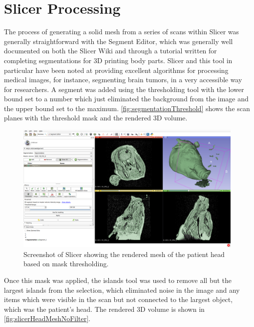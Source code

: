 \documentclass[12pt]{report}
\begin{document}
\section{Slicer Processing}
The process of generating a solid mesh from a series of scans within Slicer was generally straightforward with the Segment Editor, which was generally well documented on both the Slicer Wiki and through a tutorial written for completing segmentations for 3D printing body parts. \cite{segmentationEditorTutorial} Slicer and this tool in particular have been noted at providing excellent algorithms for processing medical images, for instance, segmenting brain tumors, in a very accessible way for researchers. \cite{segmentationEditorPaper} A segment was added using the thresholding tool with the lower bound set to a number which just eliminated the background from the image and the upper bound set to the maximum. \autoref{fig:segmentationThreshold} shows the scan planes with the threshold mask and the rendered 3D volume.

\begin{figure}[thpb]
	\centering
	\includegraphics[width=\textwidth]{images/segmentation_threshold.png}
    \caption{Screenshot of Slicer showing the rendered mesh of the patient head based on mask thresholding.}
    \label{fig:segmentationThreshold}
\end{figure}

Once this mask was applied, the islands tool was used to remove all but the largest islands from the selection, which eliminated noise in the image and any items which were visible in the scan but not connected to the largest object, which was the patient's head. The rendered 3D volume is shown in \autoref{fig:slicerHeadMeshNoFilter}.
\end{document}
